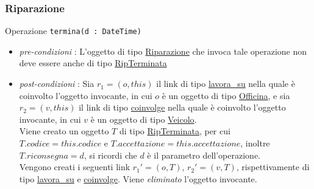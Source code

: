 \documentclass[12pt, letterpaper]{article}
\newcommand{\code}[1]{\colorbox{light-gray}{\texttt{#1}}}
\begin{document}
\subsubsection{Riparazione}
Operazione \code{termina(d : DateTime)}\begin{itemize}
    \item  \textit{pre-condizioni} : L'oggetto di tipo \underline{Riparazione} che invoca
          tale operazione non deve essere anche di tipo \underline{RipTerminata}

    \item \textit{post-condizioni} : Sia $r_1=(o,this)$ il link di tipo \underline{lavora\_su}
          nella quale è coinvolto l'oggetto invocante, in cui $o$ è un oggetto di tipo \underline{Officina},
          e sia $r_2=(v,this)$ il link di tipo \underline{coinvolge}
          nella quale è coinvolto l'oggetto invocante, in cui $v$ è un oggetto di tipo \underline{Veicolo}.\\

          Viene creato un oggetto $T$ di tipo \underline{RipTerminata}, per cui $T.codice=this.codice$ e
          $T.accettazione=this.accettazione$, inoltre $T.riconsegna=d$, si ricordi che $d$ è il parametro
          dell'operazione.\\

          Vengono creati i seguenti link $r_1'=(o,T)$, $r_2'=(v,T)$, rispettivamente di tipo \underline{lavora\_su}
          e \underline{coinvolge}. Viene \textit{eliminato} l'oggetto invocante.

\end{itemize}
\end{document}
